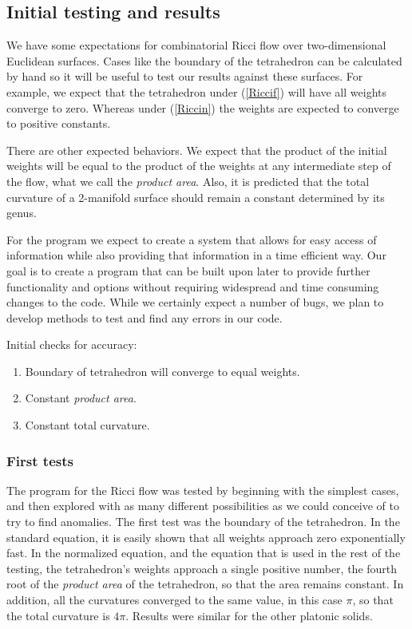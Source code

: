 \documentclass[12pt]{article}
\begin{document}
\subsection{Initial testing and results}
We have some expectations for combinatorial Ricci flow over two-dimensional Euclidean surfaces. Cases like the boundary of the tetrahedron can be calculated by hand so it will be useful to test our results against these surfaces. For example, we expect that the tetrahedron under (\ref{Riccif}) will have all weights converge to zero. Whereas under (\ref{Riccin}) the weights are expected to converge to positive constants.\newline

\noindent There are other expected behaviors. We expect that the product of the initial weights will be equal to the product of the weights at any intermediate step of the flow, what we call the \textit{product area}. Also, it is predicted that the total curvature of a 2-manifold surface should remain a constant determined by its genus.\newline

\noindent For the program we expect to create a system that allows for easy access of information while also providing that information in a time efficient way. Our goal is to create a program that can be built upon later to provide further functionality and options without requiring widespread and time consuming changes to the code. While we certainly expect a number of bugs, we plan to develop methods to test and find any errors in our code. \newline

\noindent Initial checks for accuracy:
\begin{enumerate}
\item Boundary of tetrahedron will converge to equal weights.
\item Constant \textit{product area}.
\item Constant total curvature.
\end{enumerate}

\subsubsection{First tests}
The program for the Ricci flow was tested by beginning with the simplest cases, and then explored with as many different possibilities as we could conceive of to try to find anomalies. The first test was the boundary of the tetrahedron. In the standard equation, it is easily shown that all weights approach zero exponentially fast. In the normalized equation, and the equation that is used in the rest of the testing, the tetrahedron's weights approach a single positive number, the fourth root of the \textit{product area} of the tetrahedron, so that the area remains constant. In addition, all the curvatures converged to the same value, in this case $\pi$, so that the total curvature is $4\pi$. Results were similar for the other platonic solids.\newline
\end{document}
